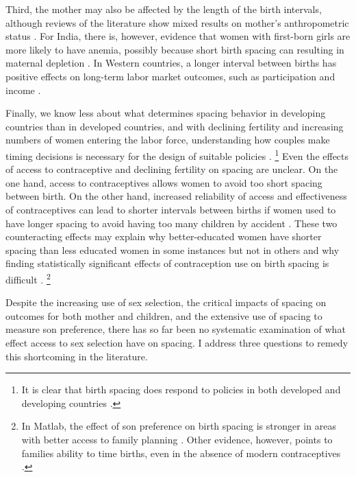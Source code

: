 \documentclass[12pt,letterpaper]{article}
\begin{document}
Third, the mother may also be affected by the length of the birth intervals, although 
reviews of the literature show mixed results on mother's anthropometric status 
\citep{Dewey2007,Conde-Agudelo2012}.
For India, there is, however, evidence that women with first-born girls are more likely to 
have anemia, possibly because short birth spacing can resulting in maternal depletion 
\citep{Milazzo2018}.
In Western countries, a longer interval between births has positive effects on long-term 
labor market outcomes, such as participation and income \citep{Gough2017,Karimi2014}.

Finally, we know less about what determines spacing behavior in developing countries than 
in developed countries, and with declining fertility and increasing numbers of women 
entering the labor force, understanding how couples make timing decisions is necessary 
for the design of suitable policies \citep{Portner2018}.%
\footnote{
It is clear that birth spacing does respond to policies in both developed and 
developing countries \citep{Pettersson-Lidbom2009,Todd2012,Meckel2015,Ghosh2018}.
}
Even the effects of access to contraceptive and declining fertility on spacing are unclear.
On the one hand, access to contraceptives allows women to avoid too short spacing between 
birth.
On the other hand, increased reliability of access and effectiveness of contraceptives can 
lead to shorter intervals between births if women used to have longer spacing to avoid
having too many children by accident \citep{Keyfitz1971,Heckman1976}.
These two counteracting effects may explain why better-educated women have shorter spacing 
than less educated women in some instances but not in others and why finding statistically 
significant effects of contraception use on birth spacing is difficult 
\citep{Tulasidhar1993,Whitworth2002,Bhalotra2008,Yeakey2009,Kim2010,Soest2018}.%
\footnote{
In Matlab, the effect of son preference on birth spacing is stronger in areas with better 
access to family planning \citep{Rahman1993}.
Other evidence, however, points to families ability to time births, even in the absence
of modern contraceptives \citep{Jayachandran2011,Alam2018}.
}

Despite the increasing use of sex selection, the critical impacts of spacing on outcomes 
for both mother and children, and the extensive use of spacing to measure son preference, 
there has so far been no systematic examination of what effect access to sex selection 
have on spacing.
I address three questions to remedy this shortcoming in the literature.
\end{document}
